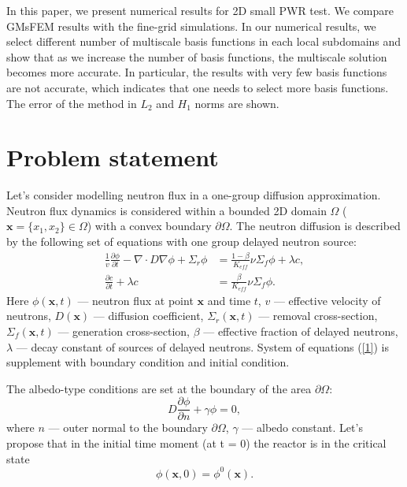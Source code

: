 \documentclass[runningheads]{llncs}
\begin{document}
In this paper, we present numerical results for 2D small PWR test. 
We compare GMsFEM results with the fine-grid simulations. 
In our numerical results, we select different number of multiscale basis functions in each local subdomains and show that as we increase the number of basis functions, the multiscale solution becomes more accurate. 
In particular, the results with very few basis functions are not accurate, which indicates that one needs to select more basis functions. 
The error of the method in $L_2$ and $H_1$ norms are shown. 

\section{Problem statement}
Let's consider modelling neutron flux in a one-group diffusion approximation. 
Neutron flux dynamics is considered within a bounded 2D domain  $\Omega$ ($\bm x = \{x_1, x_2\} \in \Omega$) with a convex boundary $\partial \Omega$. 
The neutron diffusion is described by the following set of equations with one group delayed neutron source:
\begin{equation}\label{1}
\begin{split}
 \frac{1}{v} \frac{\partial \phi}{\partial t} - \nabla \cdot D \nabla \phi + \Sigma_r \phi &= \frac{1 - \beta}{K_{eff}} \nu \Sigma_f \phi + \lambda c, \\
\frac{\partial c}{\partial t} + \lambda c &= \frac{\beta}{K_{eff}} \nu \Sigma_f \phi.
\end{split}
\end{equation} 
Here $\phi(\bm x,t)$ --- neutron flux  at point $\bm x$ and time $t$,
$v$ --- effective velocity of neutrons,
$D(\bm x)$ --- diffusion coefficient, 
$\Sigma_r(\bm x,t)$ --- removal cross-section,
$\Sigma_f(\bm x,t)$ --- generation cross-section,
$\beta$ --- effective fraction of delayed neutrons, 
$\lambda$ --- decay constant of sources of delayed neutrons.
System of equations (\ref{1}) is supplement with boundary condition and  initial condition.

The albedo-type conditions are set at the boundary of the area $\partial \Omega$:
\begin{equation}\label{2}
 D\frac{\partial \phi}{\partial n} + \gamma \phi = 0,
\end{equation} 
where $n$ --- outer normal to the boundary $\partial \Omega$, $\gamma$ --- albedo constant.
Let's propose that in the initial time moment (at t = 0) the reactor is in the critical state
\begin{equation}\label{3}
 \phi(\bm x,0) = \phi^0(\bm x).
\end{equation} 
\end{document}
